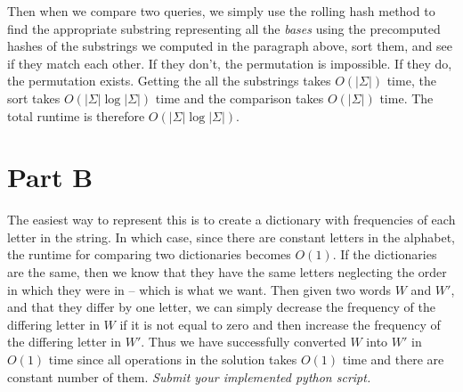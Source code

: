 \documentclass[12pt,twoside]{article}
\begin{document}
\begin{problems}
\begin{problemparts}
Then when we compare two queries, we simply use the rolling hash method to find the appropriate substring representing all the \emph{bases} using the precomputed hashes of the substrings we computed in the paragraph above, sort them, and see if they match each other. If they don't, the permutation is impossible. If they do, the permutation exists. Getting the all the substrings takes $O(| \Sigma | )$ time, the sort takes $O(| \Sigma | \log | \Sigma|)$ time and the comparison takes $O(| \Sigma|)$ time. The total runtime is therefore $O(| \Sigma | \log | \Sigma|)$.
\end{problemparts}
\section*{Part B}
\problem  %
\begin{problemparts}
\problempart %
The easiest way to represent this is to create a dictionary with frequencies of each letter in the string. In which case, since there are constant letters in the alphabet, the runtime for comparing two dictionaries becomes $O(1)$. If the dictionaries are the same, then we know that they have the same letters neglecting the order in which they were in -- which is what we want. Then given two words $W$ and $W'$, and that they differ by one letter, we can simply decrease the frequency of the differing letter in $W$ if it is not equal to zero and then increase the frequency of the differing letter in $W'$. Thus we have successfully converted $W$ into $W'$ in $O(1)$ time since all operations in the solution takes $O(1)$ time and there are constant number of them.
\problempart \emph{Submit your implemented python script.}  %
\end{problemparts}
\end{problems}
\end{document}

